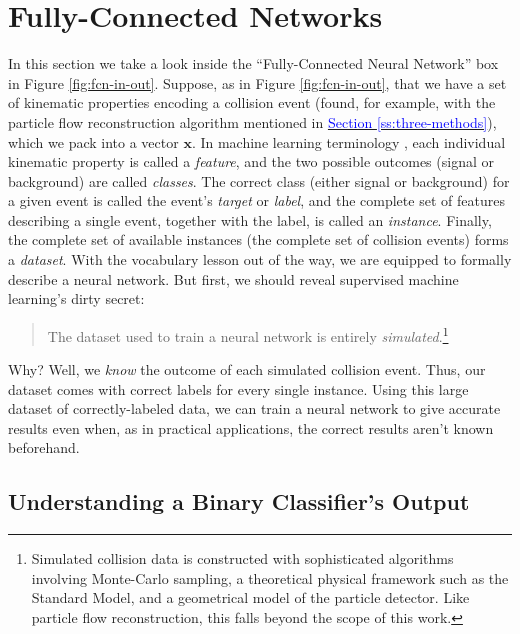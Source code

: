 \documentclass[11pt, a4paper]{article}
\newcommand{\myhref}[2]{\hyperref[#1]{\textcolor{blue}{#2}}}
\renewcommand{\vec}[1]{\bm{#1}}
\begin{document}
\section{Fully-Connected Networks} \label{s:fcn}
In this section we take a look inside the ``Fully-Connected Neural Network'' box in Figure \ref{fig:fcn-in-out}. Suppose, as in Figure \ref{fig:fcn-in-out}, that we have a set of kinematic properties encoding a collision event (found, for example, with the particle flow reconstruction algorithm mentioned in \myhref{ss:three-methods}{Section \ref{ss:three-methods}}), which we pack into a vector $ \vec{x} $. In machine learning terminology \cite{homl}, each individual kinematic property is called a \textit{feature}, and the two possible outcomes (signal or background) are called \textit{classes}. The correct class (either signal or background) for a given event is called the event's \textit{target} or \textit{label}, and the complete set of features describing a single event, together with the label, is called an \textit{instance}. Finally, the complete set of available instances (the complete set of collision events) forms a \textit{dataset}. With the vocabulary lesson out of the way, we are equipped to formally describe a neural network. But first, we should reveal supervised machine learning's dirty secret:
\begin{quote}
The dataset used to train a neural network is entirely \textit{simulated}.\footnote{Simulated collision data is constructed with sophisticated algorithms involving Monte-Carlo sampling, a theoretical physical framework such as the Standard Model, and a geometrical model of the particle detector. Like particle flow reconstruction, this falls beyond the scope of this work.}
\end{quote}
Why? Well, we \textit{know} the outcome of each simulated collision event. Thus, our dataset comes with correct labels for every single instance. Using this large dataset of correctly-labeled data, we can train a neural network to give accurate results even when, as in practical applications, the correct results aren't known beforehand. 

\subsection{Understanding a Binary Classifier's Output} \label{ss:output}
\end{document}

